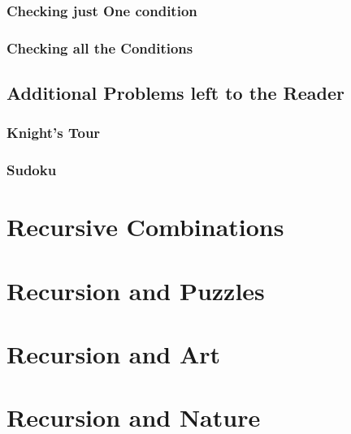 \subsubsection{Checking just One condition}


\subsubsection{Checking all the Conditions}




\subsection{Additional Problems left to the Reader}

\subsubsection{Knight's Tour}

\subsubsection{Sudoku}




\section{Recursive Combinations}



\section{Recursion and Puzzles}



\section{Recursion and Art}

\section{Recursion and Nature}
